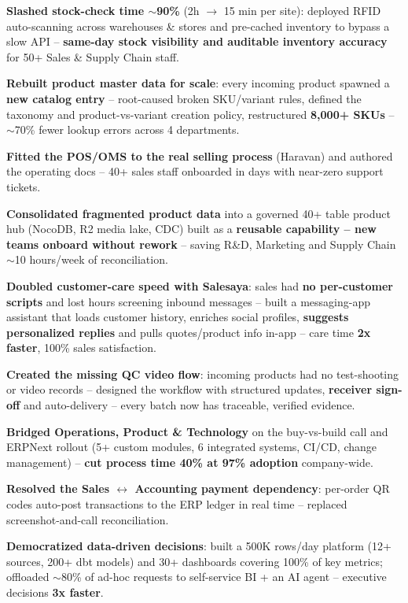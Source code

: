 
\vspace{1pt}
\begin{resume_list}
  \item \textbf{Slashed stock-check time $\sim$90\%} (2h $\rightarrow$ 15 min per site): deployed RFID auto-scanning across warehouses \& stores and pre-cached inventory to bypass a slow API -- \textbf{same-day stock visibility and auditable inventory accuracy} for 50+ Sales \& Supply Chain staff.
  \item \textbf{Rebuilt product master data for scale}: every incoming product spawned a \textbf{new catalog entry} -- root-caused broken SKU/variant rules, defined the taxonomy and product-vs-variant creation policy, restructured \textbf{8{,}000+ SKUs} -- $\sim$70\% fewer lookup errors across 4 departments.
  \item \textbf{Fitted the POS/OMS to the real selling process} (Haravan) and authored the operating docs -- 40+ sales staff onboarded in days with near-zero support tickets.
  \item \textbf{Consolidated fragmented product data} into a governed 40+ table product hub (NocoDB, R2 media lake, CDC) built as a \textbf{reusable capability -- new teams onboard without rework} -- saving R\&D, Marketing and Supply Chain $\sim$10 hours/week of reconciliation.
  \item \textbf{Doubled customer-care speed with Salesaya}: sales had \textbf{no per-customer scripts} and lost hours screening inbound messages -- built a messaging-app assistant that loads customer history, enriches social profiles, \textbf{suggests personalized replies} and pulls quotes/product info in-app -- care time \textbf{2x faster}, 100\% sales satisfaction.
  \item \textbf{Created the missing QC video flow}: incoming products had no test-shooting or video records -- designed the workflow with structured updates, \textbf{receiver sign-off} and auto-delivery -- every batch now has traceable, verified evidence.
  \item \textbf{Bridged Operations, Product \& Technology} on the buy-vs-build call and ERPNext rollout (5+ custom modules, 6 integrated systems, CI/CD, change management) -- \textbf{cut process time 40\% at 97\% adoption} company-wide.
  \item \textbf{Resolved the Sales $\leftrightarrow$ Accounting payment dependency}: per-order QR codes auto-post transactions to the ERP ledger in real time -- replaced screenshot-and-call reconciliation.
  \item \textbf{Democratized data-driven decisions}: built a 500K rows/day platform (12+ sources, 200+ dbt models) and 30+ dashboards covering 100\% of key metrics; offloaded $\sim$80\% of ad-hoc requests to self-service BI + an AI agent -- executive decisions \textbf{3x faster}.
\end{resume_list}
